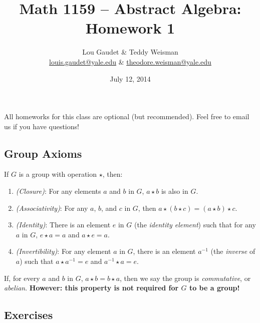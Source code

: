 \documentclass[10pt, letterpaper]{article}
\begin{document}
\title{Math 1159 -- Abstract Algebra: Homework 1}
\author{Lou Gaudet \& Teddy Weisman \\ 
\url{louis.gaudet@yale.edu} \& \url{theodore.weisman@yale.edu}}
\date{July 12, 2014}
\maketitle

All homeworks for this class are optional (but recommended). Feel free
to email us if you have questions!

\subsection*{Group Axioms}
If $G$ is a group with operation $\star$, then:
\begin{enumerate}
\item \emph{(Closure)}: For any elements $a$ and $b$ in $G$, $a \star
  b$ is also in $G$.

\item \emph{(Associativity)}: For any $a$, $b$, and $c$ in $G$, then
  $a \star (b \star c) = (a \star b) \star c$.

\item \emph{(Identity)}: There is an element $e$ in $G$ (the
  \emph{identity element}) such that for any $a$ in $G$, $e \star a =
  a$ and $a \star e = a$. 

\item \emph{(Invertibility)}: For any element $a$ in $G$, there is an
  element $a^{-1}$ (the \emph{inverse} of $a$) such that $a \star
  a^{-1} = e$ and $a^{-1} \star a = e$.

\end{enumerate}

If, for every $a$ and $b$ in $G$, $a \star b = b \star a$, then we say
the group is \emph{commutative}, or \emph{abelian}. \textbf{However:
  this property is not required for $G$ to be a group!}

\subsection*{Exercises}
\end{document}
